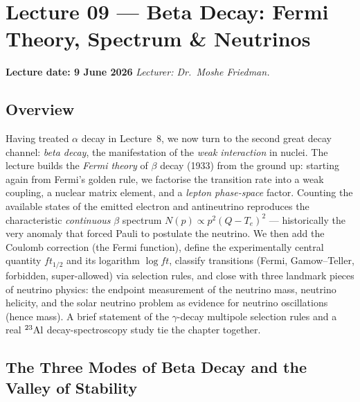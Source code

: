 
\section{Lecture 09 — Beta Decay: Fermi Theory, Spectrum \& Neutrinos}
\label{sec:lec09}

\noindent\textbf{\textcolor{doc}{Lecture date: 9 June 2026}}\quad\textemdash\quad
\textit{Lecturer: Dr.\ Moshe Friedman.}

\subsection*{Overview}
Having treated $\alpha$ decay in Lecture~8, we now turn to the second great decay
channel: \emph{beta decay}, the manifestation of the \emph{weak interaction} in
nuclei. The lecture builds the \emph{Fermi theory} of $\beta$ decay (1933) from
the ground up: starting again from Fermi's golden rule, we factorise the
transition rate into a weak coupling, a nuclear matrix element, and a
\emph{lepton phase-space} factor. Counting the available states of the emitted
electron and antineutrino reproduces the characteristic \emph{continuous} $\beta$
spectrum $N(p)\propto p^2(Q-T_e)^2$ --- historically the very anomaly that forced
Pauli to postulate the neutrino. We then add the Coulomb correction (the Fermi
function), define the experimentally central quantity $ft_{1/2}$ and its logarithm
$\log ft$, classify transitions (Fermi, Gamow--Teller, forbidden, super-allowed)
via selection rules, and close with three landmark pieces of neutrino physics:
the endpoint measurement of the neutrino mass, neutrino helicity, and the solar
neutrino problem as evidence for neutrino oscillations (hence mass). A brief
statement of the $\gamma$-decay multipole selection rules and a real
$\nucleus{Al}{23}$ decay-spectroscopy study tie the chapter together.

\subsection{The Three Modes of Beta Decay and the Valley of Stability}
\label{subsec:lec09:modes}

